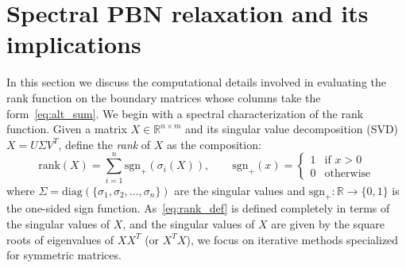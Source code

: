 \documentclass[10pt]{article}
\numberwithin{equation}{section}
\newcommand{\+}{%
	\raisebox{0.18ex}{\scaleobj{0.55}{+}}
}
\theoremstyle{definition}
\begin{document}
\section{Spectral PBN relaxation and its implications}\label{sec:methodology}
In this section we discuss the computational details involved in evaluating the rank function on the boundary matrices whose columns take the form~\eqref{eq:alt_sum}. We begin with a spectral characterization of the rank function. Given a matrix $X \in \mathbb{R}^{n \times m}$ and its singular value decomposition (SVD) $X = U \Sigma V^T$, define the \emph{rank} of $X$ as the composition:
\begin{equation}\label{eq:rank_def}
	\mathrm{rank}(X) = \sum\limits_{i=1}^{n} \mathrm{sgn}_+(\sigma_i(X)), \quad \quad \mathrm{sgn}_{+}(x) = \begin{cases}
		1 & \text{if } x > 0 \\
		0 & \text{otherwise}
	\end{cases}
\end{equation}
where $\Sigma = \mathrm{diag}(\{\sigma_1, \sigma_2, \dots, \sigma_n \})$ are the singular values  and $\mathrm{sgn}_+: \mathbb{R} \to \{0, 1\}$ is the one-sided sign function. As~\eqref{eq:rank_def} is defined completely in terms of the singular values of $X$, and the singular values of $X$ are given by the square roots of eigenvalues of $X X^T$ (or $X^T X$), we focus on iterative methods specialized for symmetric matrices. 

\end{document}
